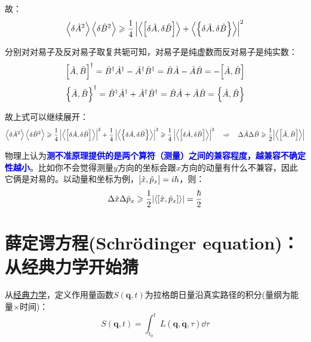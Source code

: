 故：
\[\left \langle \delta\hat{A}^2 \right \rangle\left \langle \delta\hat{B}^2 \right \rangle \geqslant \frac{1}{4} \left | \left \langle \comm{\delta\hat{A}}{\delta\hat{B}} \right \rangle+\left \langle \qty{\delta\hat{A},\delta\hat{B}} \right \rangle \right |^2\]

分别对对易子及反对易子取复共轭可知，对易子是纯虚数而反对易子是纯实数：
\[\comm{\hat{A}}{\hat{B}}^{\dagger}=\hat{B}^{\dagger}\hat{A}^{\dagger}-\hat{A}^{\dagger}\hat{B}^{\dagger}=\hat{B}\hat{A}-\hat{A}\hat{B}=-\comm{\hat{A}}{\hat{B}}\]
\[\qty{\hat{A},\hat{B}}^{\dagger}=\hat{B}^{\dagger}\hat{A}^{\dagger}+\hat{A}^{\dagger}\hat{B}^{\dagger}=\hat{B}\hat{A}+\hat{A}\hat{B}=\qty{\hat{A},\hat{B}}\]

故上式可以继续展开：
\[\left \langle \delta\hat{A}^2 \right \rangle\left \langle \delta\hat{B}^2 \right \rangle \geqslant \frac{1}{4} \left | \left \langle \comm{\delta\hat{A}}{\delta\hat{B}} \right \rangle \right |^2 +\frac{1}{4} \left |\left \langle \qty{\delta\hat{A},\delta\hat{B}} \right \rangle \right |^2 \geqslant \frac{1}{4} \left | \left \langle \comm{\delta\hat{A}}{\delta\hat{B}} \right \rangle \right |^2 \quad \Rightarrow \quad \Delta \hat{A}\Delta \hat{B} \geqslant \frac{1}{2}\qty|\left \langle \comm{\hat{A}}{\hat{B}} \right \rangle|\]

物理上认为\textcolor{blue}{\textbf{测不准原理提供的是两个算符（测量）之间的兼容程度，越兼容不确定性越小}}。比如你不会觉得测量$y$方向的坐标会跟$x$方向的动量有什么不兼容，因此它俩是对易的。以动量和坐标为例，$\comm{\hat{x}}{\hat{p}_x}=i\hbar$，则：
\[\Delta \hat{x}\Delta \hat{p}_x \geqslant \frac{1}{2}\qty|\left \langle \comm{\hat{x}}{\hat{p}_x} \right \rangle|=\frac{\hbar}{2}\]

\section{薛定谔方程(Schrödinger equation)：从经典力学开始猜}
从\href{https://github.com/Astolfo-Official/Mathematics-in-Quantum-Chemistry/blob/main/%E3%80%8A%E9%87%8F%E5%AD%90%E5%8C%96%E5%AD%A6%E4%B8%AD%E7%9A%84%E6%95%B0%E5%AD%A6%E3%80%8B2.0.pdf}{经典力学}，定义作用量函数$S(\bm{q},t)$为拉格朗日量沿真实路径的积分(量纲为能量$\times$时间)：
\[S(\bm{q},t)=\int_{t_0}^{t} L(\bm{q},\dot{\bm{q}},\tau)\dd{\tau}\]

